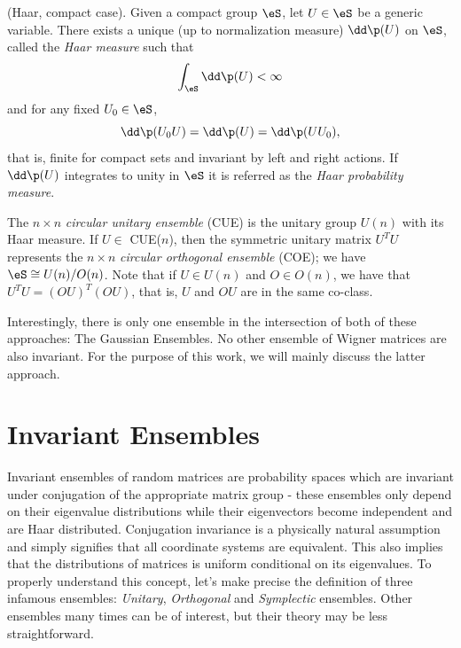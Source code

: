 \begin{teorema}
	(Haar, compact case). Given a compact group $\eS$, let $U \in \eS$ be a generic variable. There exists a unique (up to normalization measure) $\dd \p(U)$ on $\eS$, called the \textit{Haar measure} such that \begin{equation}\int_{\eS} \dd \p(U) < \infty\end{equation} and for any fixed $U_0 \in \eS$, $$\dd\p(U_0U) = \dd\p(U) = \dd\p(UU_0),$$ that is, finite for compact sets and invariant by left and right actions. If $\dd \p(U)$ integrates to unity in $\eS$ it is referred as the \textit{Haar probability measure}.
\end{teorema}

\begin{exemplo}
	The $n \times n$ \textit{circular unitary ensemble} (CUE) is the unitary group $U(n)$ with its Haar measure. If $U \in$ CUE($n$), then the symmetric unitary matrix $U^TU$ represents the $n \times n$ \textit{circular orthogonal ensemble} (COE); we have $\eS \cong U(n)/O(n)$. Note that if $U \in U(n)$ and $O \in O(n)$, we have that $U^TU = (OU)^T(OU)$, that is, $U$ and $OU$ are in the same co-class.
\end{exemplo}

Interestingly, there is only one ensemble in the intersection of both of these approaches: The Gaussian Ensembles. No other ensemble of Wigner matrices are also invariant. For the purpose of this work, we will mainly discuss the latter approach.

\section{Invariant Ensembles}

Invariant ensembles of random matrices are probability spaces which are invariant under conjugation of the appropriate matrix group - these ensembles only depend on their eigenvalue distributions while their eigenvectors become independent and are Haar distributed. Conjugation invariance is a physically natural assumption and simply signifies that all coordinate systems are equivalent. This also implies that the distributions of matrices is uniform conditional on its eigenvalues. To properly understand this concept, let's make precise the definition of three infamous ensembles: \textit{Unitary}, \textit{Orthogonal} and \textit{Symplectic} ensembles. Other ensembles many times can be of interest, but their theory may be less straightforward.

